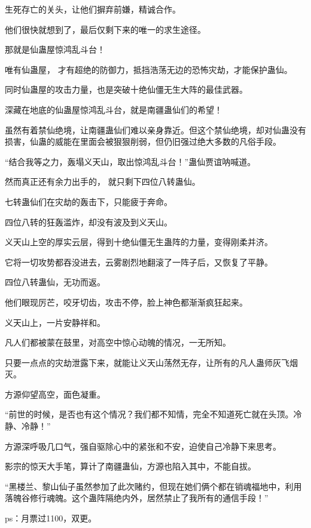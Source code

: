 \begin{this_body}
生死存亡的关头，让他们摒弃前嫌，精诚合作。

他们很快就想到了，最后仅剩下来的唯一的求生途径。

那就是仙蛊屋惊鸿乱斗台！

唯有仙蛊屋， 才有超绝的防御力，抵挡浩荡无边的恐怖灾劫，才能保护蛊仙。

同时仙蛊屋的攻击力量，也是突破十绝仙僵无生大阵的最佳武器。

深藏在地底的仙蛊屋惊鸿乱斗台，就是南疆蛊仙们的希望！

虽然有着禁仙绝境，让南疆蛊仙们难以亲身靠近。但这个禁仙绝境，却对仙蛊没有损害，仙蛊的威能在里面会被狠狠削弱，但仍旧强过绝大多数的凡俗手段。

“结合我等之力，轰塌义天山，取出惊鸿乱斗台！”蛊仙贾谊呐喊道。

然而真正还有余力出手的， 就只剩下四位八转蛊仙。

七转蛊仙们在灾劫的轰击下，只能疲于奔命。

四位八转的狂轰滥炸，却没有波及到义天山。

义天山上空的厚实云层，得到十绝仙僵无生蛊阵的力量，变得刚柔并济。

它将一切攻势都吞没进去，云雾剧烈地翻滚了一阵子后，又恢复了平静。

四位八转蛊仙，无功而返。

他们眼现厉芒，咬牙切齿，攻击不停，脸上神色都渐渐疯狂起来。

义天山上，一片安静祥和。

凡人们都被蒙在鼓里，对高空中惊心动魄的情况，一无所知。

只要一点点的灾劫泄露下来，就能让义天山荡然无存，让所有的凡人蛊师灰飞烟灭。

方源仰望高空，面色凝重。

“前世的时候，是否也有这个情况？我们都不知情，完全不知道死亡就在头顶。冷静、冷静！”

方源深呼吸几口气，强自驱除心中的紧张和不安，迫使自己冷静下来思考。

影宗的惊天大手笔，算计了南疆蛊仙，方源也陷入其中，不能自拔。

“黑楼兰、黎山仙子虽然参加了此次赌约，但现在她们俩个都在销魂福地中，利用落魄谷修行魂魄。这个蛊阵隔绝内外，居然禁止了我所有的通信手段！”

ps：月票过1100，双更。

\end{this_body}

